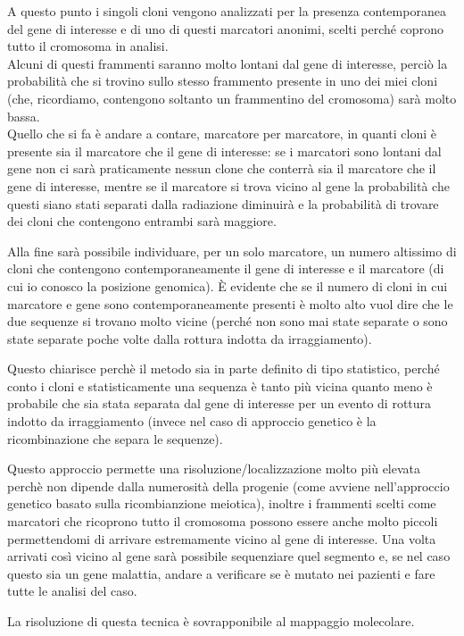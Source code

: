 \documentclass[11pt]{book}
\begin{document}
A questo punto i singoli cloni vengono analizzati per la presenza contemporanea del gene di interesse e di uno di questi marcatori anonimi, scelti perché coprono tutto il cromosoma in analisi.\\
Alcuni di questi frammenti saranno molto lontani dal gene di interesse, perciò la probabilità che si trovino sullo stesso frammento presente in uno dei miei cloni (che, ricordiamo, contengono soltanto un frammentino del cromosoma) sarà molto bassa.\\
Quello che si fa è andare a contare, marcatore per marcatore, in quanti cloni è presente sia il marcatore che il gene di interesse: se i marcatori sono lontani dal gene non ci sarà praticamente nessun clone che conterrà sia il marcatore che il gene di interesse, mentre se il marcatore si trova vicino al gene la probabilità che questi siano stati separati dalla radiazione diminuirà e la probabilità di trovare dei cloni che contengono entrambi sarà maggiore.

Alla fine sarà possibile individuare, per un solo marcatore, un numero altissimo di cloni che contengono contemporaneamente il gene di interesse e il marcatore (di cui io conosco la posizione genomica). È evidente che se il numero di cloni in cui marcatore e gene sono contemporaneamente presenti è molto alto vuol dire che le due sequenze si trovano molto vicine (perché non sono mai state separate o sono state separate poche volte dalla rottura indotta da irraggiamento). 

Questo chiarisce perchè il metodo sia in parte definito di tipo statistico, perché conto i cloni e statisticamente una sequenza è tanto più vicina quanto meno è probabile che sia stata separata dal gene di interesse per un evento di rottura indotto da irraggiamento (invece nel caso di approccio genetico è la ricombinazione che separa le sequenze).

Questo approccio permette una risoluzione/localizzazione molto più elevata perchè non dipende dalla numerosità della progenie (come avviene nell'approccio genetico basato sulla ricombianzione meiotica), inoltre i frammenti scelti come marcatori che ricoprono tutto il cromosoma possono essere anche molto piccoli permettendomi di arrivare estremamente vicino al gene di interesse. Una volta arrivati così vicino al gene sarà possibile sequenziare quel segmento e, se nel caso questo sia un gene malattia, andare a verificare se è mutato nei pazienti e fare tutte le analisi del caso. 

La risoluzione di questa tecnica è sovrapponibile al mappaggio molecolare.
\end{document}
